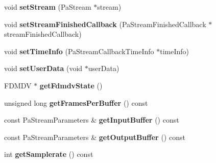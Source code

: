 \begin{DoxyCompactItemize}
\item 
\hypertarget{class_port_audio_wrap_a8f18f16ddf796eba036e11694b25a2a4}{void {\bfseries set\-Stream} (Pa\-Stream $\ast$stream)}\label{class_port_audio_wrap_a8f18f16ddf796eba036e11694b25a2a4}

\item 
\hypertarget{class_port_audio_wrap_a13581d19c503fc1a837078c31d80df11}{void {\bfseries set\-Stream\-Finished\-Callback} (Pa\-Stream\-Finished\-Callback $\ast$stream\-Finished\-Callback)}\label{class_port_audio_wrap_a13581d19c503fc1a837078c31d80df11}

\item 
\hypertarget{class_port_audio_wrap_a4d2bb7132714099aa2a0390f11a57ce6}{void {\bfseries set\-Time\-Info} (Pa\-Stream\-Callback\-Time\-Info $\ast$time\-Info)}\label{class_port_audio_wrap_a4d2bb7132714099aa2a0390f11a57ce6}

\item 
\hypertarget{class_port_audio_wrap_a2bac5a36a40fd1f86df5c1f94e964ac4}{void {\bfseries set\-User\-Data} (void $\ast$user\-Data)}\label{class_port_audio_wrap_a2bac5a36a40fd1f86df5c1f94e964ac4}

\item 
\hypertarget{class_port_audio_wrap_a66693a413ee2158cc331253a1035f915}{F\-D\-M\-D\-V $\ast$ {\bfseries get\-Fdmdv\-State} ()}\label{class_port_audio_wrap_a66693a413ee2158cc331253a1035f915}

\item 
\hypertarget{class_port_audio_wrap_ad2ea7c12d674b8bf882a5a5ffdff7acb}{unsigned long {\bfseries get\-Frames\-Per\-Buffer} () const }\label{class_port_audio_wrap_ad2ea7c12d674b8bf882a5a5ffdff7acb}

\item 
\hypertarget{class_port_audio_wrap_a3e2997d41e53309bfb6b06baabb43a04}{const Pa\-Stream\-Parameters \& {\bfseries get\-Input\-Buffer} () const }\label{class_port_audio_wrap_a3e2997d41e53309bfb6b06baabb43a04}

\item 
\hypertarget{class_port_audio_wrap_abb0273b674c970ee96594dd61f7abfc9}{const Pa\-Stream\-Parameters \& {\bfseries get\-Output\-Buffer} () const }\label{class_port_audio_wrap_abb0273b674c970ee96594dd61f7abfc9}

\item 
\hypertarget{class_port_audio_wrap_a2007046aefb3754994b3fe883b237177}{int {\bfseries get\-Samplerate} () const }\label{class_port_audio_wrap_a2007046aefb3754994b3fe883b237177}


\end{DoxyCompactItemize}
